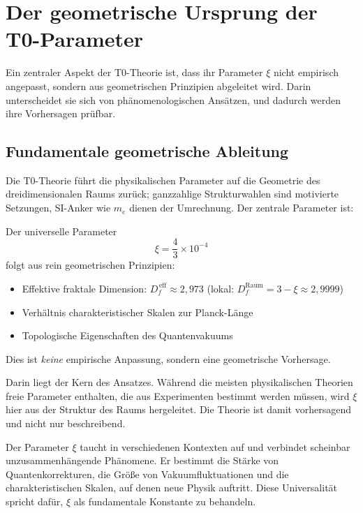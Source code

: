 	\section{Der geometrische Ursprung der T0-Parameter}
	
	Ein zentraler Aspekt der T0-Theorie ist, dass ihr Parameter $\xi$ nicht empirisch angepasst, sondern aus geometrischen Prinzipien abgeleitet wird. Darin unterscheidet sie sich von phänomenologischen Ansätzen, und dadurch werden ihre Vorhersagen prüfbar.
	
	\subsection{Fundamentale geometrische Ableitung}
	
	Die T0-Theorie führt die physikalischen Parameter auf die Geometrie des dreidimensionalen Raums zurück; ganzzahlige Strukturwahlen sind motivierte Setzungen, SI-Anker wie $m_e$ dienen der Umrechnung. Der zentrale Parameter ist:
	
	\begin{tcolorbox}[colback=t0blue!5!white, colframe=t0blue!75!black, title=T0-Vorhersage]
		Der universelle Parameter
		\begin{equation}
			\xi = \frac{4}{3} \times 10^{-4}
		\end{equation}
		folgt aus rein geometrischen Prinzipien:
		\begin{itemize}
			\item Effektive fraktale Dimension: $D_f^{\,\text{eff}} \approx 2{,}973$ (lokal: $D_f^{\text{Raum}} = 3 - \xi \approx 2{,}9999$)
			\item Verhältnis charakteristischer Skalen zur Planck-Länge
			\item Topologische Eigenschaften des Quantenvakuums
		\end{itemize}
		Dies ist \emph{keine} empirische Anpassung, sondern eine geometrische Vorhersage.
	\end{tcolorbox}
	
	Darin liegt der Kern des Ansatzes. Während die meisten physikalischen Theorien freie Parameter enthalten, die aus Experimenten bestimmt werden müssen, wird $\xi$ hier aus der Struktur des Raums hergeleitet. Die Theorie ist damit vorhersagend und nicht nur beschreibend.
	
	Der Parameter $\xi$ taucht in verschiedenen Kontexten auf und verbindet scheinbar unzusammenhängende Phänomene. Er bestimmt die Stärke von Quantenkorrekturen, die Größe von Vakuumfluktuationen und die charakteristischen Skalen, auf denen neue Physik auftritt. Diese Universalität spricht dafür, $\xi$ als fundamentale Konstante zu behandeln.
	
